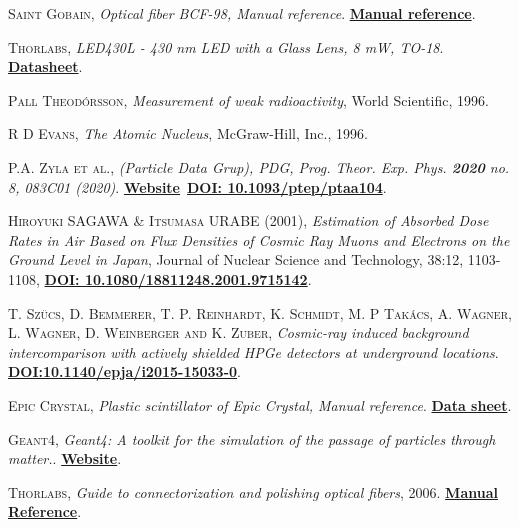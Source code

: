 \begin{thebibliography}{100}
 \textsc{Saint Gobain},
\textit{Optical fiber BCF-98, Manual reference}. \href{https://www.crystals.saint-gobain.com/products/scintillating-fiber}{\textbf{Manual reference}}.

 \textsc{Thorlabs},
\textit{LED430L - 430 nm LED with a Glass Lens, 8 mW, TO-18}. \href{https://www.thorlabs.com/thorproduct.cfm?partnumber=LED430L}{\textbf{Datasheet}}.

 \textsc{Pall Theodórsson},
\textit{Measurement of weak radioactivity}, World Scientific, 1996.

 \textsc{R D Evans},
\textit{The Atomic Nucleus}, McGraw-Hill, Inc., 1996.

 \textsc{P.A. Zyla et al.},
\textit{(Particle Data Grup), PDG, Prog. Theor. Exp. Phys. \textbf{2020} no. 8, 083C01 (2020)}. \href{https://pdg.lbl.gov/}{\textbf{Website}}~\href{https://academic.oup.com/ptep/article/2020/8/083C01/5891211}{\textbf{DOI: 10.1093/ptep/ptaa104}}.

 \textsc{Hiroyuki SAGAWA \& Itsumasa URABE (2001)},
\textit{Estimation of Absorbed Dose Rates in Air Based on Flux Densities of Cosmic Ray Muons and Electrons on the Ground Level in Japan}, Journal of Nuclear Science and Technology, 38:12, 1103-1108, \href{https://doi.org/10.1080/18811248.2001.9715142}{\textbf{DOI: 10.1080/18811248.2001.9715142}}.

 \textsc{T. Szücs, D. Bemmerer, T. P. Reinhardt, K. Schmidt, M. P Takács, A. Wagner, L. Wagner, D. Weinberger and K. Zuber},
\textit{Cosmic-ray induced background intercomparison with actively shielded HPGe detectors at underground locations}. \href{https://arxiv.org/abs/1503.00457v2}{\textbf{DOI:10.1140/epja/i2015-15033-0}}.

 \textsc{Epic Crystal},
\textit{Plastic scintillator of Epic Crystal, Manual reference}. \href{http://www.epic-crystal.com/others/plastic-scintillator.html}{\textbf{Data sheet}}.

 \textsc{Geant4},
\textit{Geant4: A toolkit for the simulation of the passage of particles through matter.}. \href{https://geant4.web.cern.ch/node/1}{\textbf{Website}}.

 \textsc{Thorlabs},
\textit{Guide to connectorization and polishing optical fibers}, 2006. \href{https://www.thorlabs.de/thorproduct.cfm?partnumber=FN96A}{\textbf{Manual Reference}}.


\end{thebibliography}
